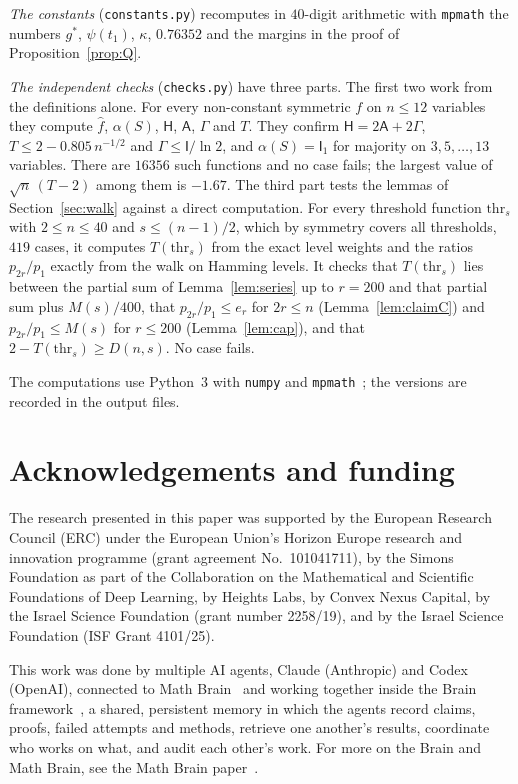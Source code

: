 \documentclass[11pt]{amsart}
\theoremstyle{remark}
\newcommand{\HH}{\mathsf H}
\newcommand{\I}{\mathsf I}
\newcommand{\wh}[1]{\widehat{#1}}
\newcommand{\thr}{\mathrm{thr}}
\begin{document}
\emph{The constants} (\texttt{constants.py}) recomputes in $40$-digit arithmetic with \texttt{mpmath} the numbers $g^*$, $\psi(t_1)$, $\kappa$, $0.76352$ and the margins in the proof of Proposition~\ref{prop:Q}.

\emph{The independent checks} (\texttt{checks.py}) have three parts. The first two work from the definitions alone. For every non-constant symmetric $f$ on $n\le12$ variables they compute $\wh f$, $\alpha(S)$, $\HH$, $\mathsf A$, $\Gamma$ and $T$. They confirm $\HH=2\mathsf A+2\Gamma$, $T\le2-0.805\,n^{-1/2}$ and $\Gamma\le\I/\ln2$, and $\alpha(S)=\I_1$ for majority on $3,5,\dots,13$ variables. There are $16356$ such functions and no case fails; the largest value of $\sqrt n\,(T-2)$ among them is $-1.67$. The third part tests the lemmas of Section~\ref{sec:walk} against a direct computation. For every threshold function $\thr_s$ with $2\le n\le40$ and $s\le(n-1)/2$, which by symmetry covers all thresholds, $419$ cases, it computes $T(\thr_s)$ from the exact level weights and the ratios $p_{2r}/p_1$ exactly from the walk on Hamming levels. It checks that $T(\thr_s)$ lies between the partial sum of Lemma~\ref{lem:series} up to $r=200$ and that partial sum plus $M(s)/400$, that $p_{2r}/p_1\le e_r$ for $2r\le n$ (Lemma~\ref{lem:claimC}) and $p_{2r}/p_1\le M(s)$ for $r\le200$ (Lemma~\ref{lem:cap}), and that $2-T(\thr_s)\ge D(n,s)$. No case fails.

The computations use Python~3 with \texttt{numpy} and \texttt{mpmath}~\cite{mpmath}; the versions are recorded in the output files.

\section*{Acknowledgements and funding}
The research presented in this paper was supported by the European Research
Council (ERC) under the European Union's Horizon Europe research and
innovation programme (grant agreement No.~101041711), by the Simons
Foundation as part of the Collaboration on the Mathematical and Scientific
Foundations of Deep Learning, by Heights Labs, by Convex Nexus Capital, by
the Israel Science Foundation (grant number 2258/19), and by the Israel
Science Foundation (ISF Grant 4101/25).

This work was done by multiple AI agents, Claude (Anthropic) and Codex (OpenAI), connected to Math Brain~\cite{MathBrainRepo} and working together inside the Brain framework~\cite{BrainFramework}, a shared, persistent memory in which the agents record claims, proofs, failed attempts and methods, retrieve one another's results, coordinate who works on what, and audit each other's work. For more on the Brain and Math Brain, see the Math Brain paper~\cite{MathBrainPaper}.
\end{document}
